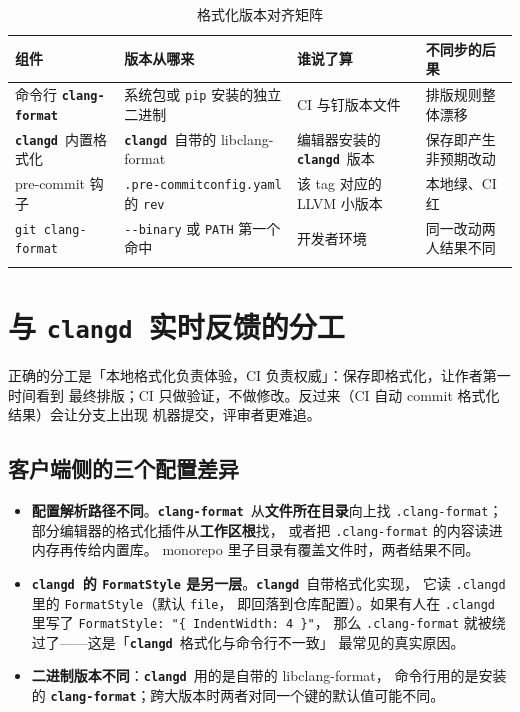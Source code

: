 \documentclass[12pt,a4paper,fontset=fandol]{ctexbook}
\newcommand{\Opt}[1]{\texttt{-\/-#1}}
\newcommand{\Lib}[1]{\textbf{\texttt{#1}}}
\newcommand{\Fmt}{\Lib{clang-format}}
\newcommand{\CD}{\Lib{clangd}}
\begin{document}
{\footnotesize
\begin{longtable}{%
  >{\raggedright\arraybackslash}p{}%
  >{\raggedright\arraybackslash}p{}%
  >{\raggedright\arraybackslash}p{}%
  >{\raggedright\arraybackslash}p{}%
  }
  \toprule
  组件 & 版本从哪来 & 谁说了算 & 不同步的后果 \\
  \midrule
  \endhead
  命令行 \Fmt & 系统包或 \texttt{pip} 安装的独立二进制 & CI 与钉版本文件 &
    排版规则整体漂移 \\
  \CD\ 内置格式化 & \CD\ 自带的 libclang-format & 编辑器安装的 \CD\ 版本 &
    保存即产生非预期改动 \\
  pre-commit 钩子 & \texttt{.pre-commit\-config.yaml} 的 \texttt{rev} &
    该 tag 对应的 LLVM 小版本 & 本地绿、CI 红 \\
  \texttt{git clang-format} & \Opt{binary} 或 \texttt{PATH} 第一个命中 &
    开发者环境 & 同一改动两人结果不同 \\
  \bottomrule
  \caption{格式化版本对齐矩阵}
  \label{tab:ch10-version}
\end{longtable}
}

\section{与 \CD\ 实时反馈的分工}\label{sec:ch10-s6}

正确的分工是「本地格式化负责体验，CI 负责权威」：保存即格式化，让作者第一时间看到
最终排版；CI 只做验证，不做修改。反过来（CI 自动 commit 格式化结果）会让分支上出现
机器提交，评审者更难追。

\subsection{客户端侧的三个配置差异}\label{sec:ch10-s6-client}

\begin{itemize}
  \item \textbf{配置解析路径不同}。\Fmt\ 从\textbf{文件所在目录}向上找
    \texttt{.clang-format}；部分编辑器的格式化插件从\textbf{工作区根}找，
    或者把 \texttt{.clang-format} 的内容读进内存再传给内置库。
    monorepo 里子目录有覆盖文件时，两者结果不同。
  \item \textbf{\CD\ 的 \texttt{FormatStyle} 是另一层}。\CD\ 自带格式化实现，
    它读 \texttt{.clangd} 里的 \texttt{FormatStyle}（默认 \texttt{file}，
    即回落到仓库配置）。如果有人在 \texttt{.clangd} 里写了
    \texttt{FormatStyle: "\{ IndentWidth: 4 \}"}，
    那么 \texttt{.clang-format} 就被绕过了——这是「\CD\ 格式化与命令行不一致」
    最常见的真实原因。
  \item \textbf{二进制版本不同}：\CD\ 用的是自带的 libclang-format，
    命令行用的是安装的 \Fmt；跨大版本时两者对同一个键的默认值可能不同。
\end{itemize}
\end{document}
